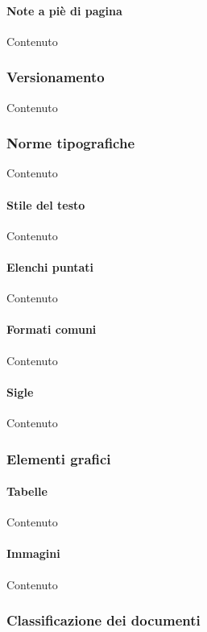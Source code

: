     \paragraph{Note a pi\`e di pagina}
    Contenuto


    \subsubsection{Versionamento}
    Contenuto


    \subsubsection{Norme tipografiche}
    Contenuto

    \paragraph{Stile del testo}
    Contenuto

    \paragraph{Elenchi puntati}
    Contenuto

    \paragraph{Formati comuni}
    Contenuto
    
    \paragraph{Sigle}
    Contenuto

    
    \subsubsection{Elementi grafici}

    \paragraph{Tabelle}
    Contenuto

    \paragraph{Immagini}
    Contenuto


    \subsubsection{Classificazione dei documenti}

